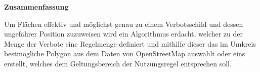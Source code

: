 \vspace*{0.25\textheight}
\hspace*{0.2\textwidth}
\parbox[b]{0.6\textwidth}{
{\begin{center}\large \bfseries Zusammenfassung  \\[2\baselineskip]\end{center}}
Um Flächen effektiv und möglichst genau zu einem Verbotsschild und dessen ungefährer
Position zuzuweisen wird ein Algorithmus erdacht, welcher zu der Menge der Verbote
eine Regelmenge definiert und mithilfe dieser das im Umkreis bestmögliche Polygon
aus dem Daten von OpenStreetMap auswählt oder eins erstellt,
welches dem Geltungsbereich der Nutzungsregel entsprechen soll.
}
